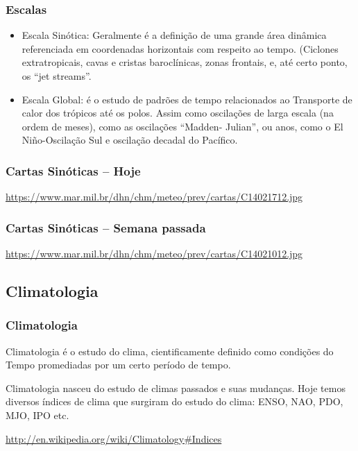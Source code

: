 \begin{frame}
\frametitle{Escalas}
  \begin{itemize}[<+-| alert@+>]
    \item Escala Sinótica: Geralmente é a definição de uma grande área dinâmica
          referenciada em coordenadas horizontais com respeito ao tempo.
          (Ciclones extratropicais, cavas e cristas baroclínicas, zonas frontais,
          e, até certo ponto, os ``jet streams''.
    \item Escala Global: é o estudo de padrões de tempo relacionados ao
          Transporte de calor dos trópicos até os polos.  Assim como oscilações
          de larga escala (na ordem de meses), como as oscilações ``Madden-
          Julian'', ou anos, como o El Niño-Oscilação Sul e oscilação decadal do
          Pacífico.
  \end{itemize}
\end{frame}

\begin{frame}
\frametitle{Cartas Sinóticas -- Hoje}
  \begin{center}
  \end{center}
{\scriptsize \url{https://www.mar.mil.br/dhn/chm/meteo/prev/cartas/C14021712.jpg}}
\end{frame}


\begin{frame}
\frametitle{Cartas Sinóticas -- Semana passada}
  \begin{center}
  \end{center}
{\scriptsize \url{https://www.mar.mil.br/dhn/chm/meteo/prev/cartas/C14021012.jpg}}
\end{frame}


\subsection{Climatologia}

\begin{frame}
\frametitle{Climatologia}
  \begin{block}{}
    Climatologia é o estudo do clima, cientificamente definido como condições
    do Tempo promediadas por um certo período de tempo.
  \end{block}
\pause
  \begin{block}{}
    Climatologia nasceu do estudo de climas passados e suas mudanças.  Hoje
    temos diversos índices de clima que surgiram do estudo do clima: ENSO, NAO,
    PDO, MJO, IPO etc.
  \end{block}
{\scriptsize \url{http://en.wikipedia.org/wiki/Climatology\#Indices}}
\end{frame}


